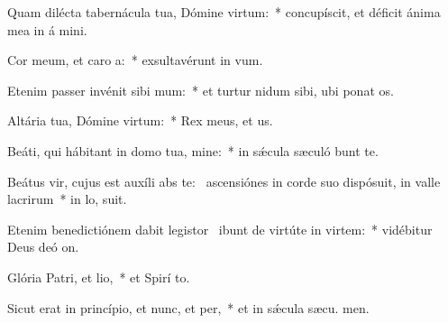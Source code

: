 \item Quam dilécta tabernácula tua, Dómine virtum:~* concupíscit, et déficit ánima mea in á mini.
\item Cor meum, et caro a:~* exsultavérunt in  vum.
\item Etenim passer invénit sibi mum:~* et turtur nidum sibi, ubi ponat  os.
\item Altária tua, Dómine virtum:~* Rex meus, et  us.
\item Beáti, qui hábitant in domo tua, mine:~* in sǽcula sæculó bunt te.
\item Beátus vir, cujus est auxíli abs te:~\pscross{} ascensiónes in corde suo dispósuit, in valle lacrirum~* in lo,  suit.
\item Etenim benedictiónem dabit legistor~\pscross{} ibunt de virtúte in virtem:~* vidébitur Deus deó  on.
\item Glória Patri, et lio,~* et Spirí to.
\item Sicut erat in princípio, et nunc, et per,~* et in sǽcula sæcu. men.
